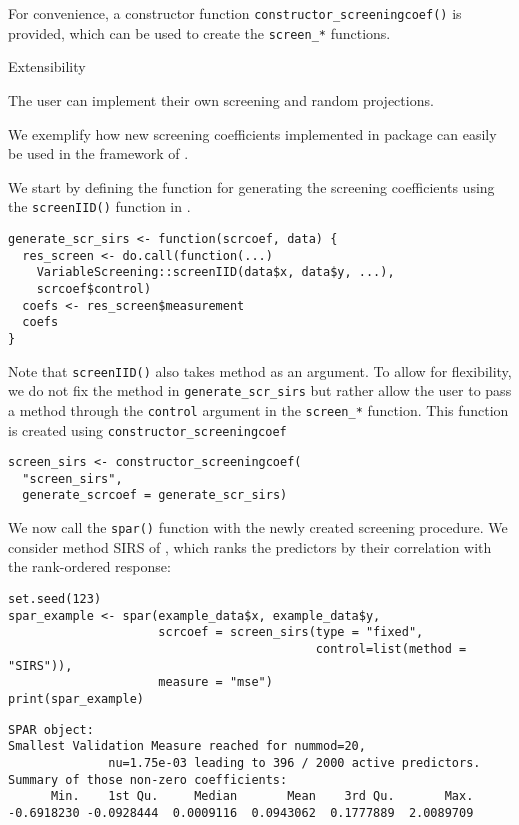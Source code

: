 \documentclass[
  article]{jss}
\begin{document}
For convenience, a constructor function
\texttt{constructor\_screeningcoef()} is provided, which can be used to
create the \texttt{screen\_*} functions.

Extensibility

The user can implement their own screening and random projections.

We exemplify how new screening coefficients implemented in package
 can easily be used in the framework of
.

We start by defining the function for generating the screening
coefficients using the \texttt{screenIID()} function in
.

\begin{verbatim}
generate_scr_sirs <- function(scrcoef, data) {
  res_screen <- do.call(function(...) 
    VariableScreening::screenIID(data$x, data$y, ...), 
    scrcoef$control)
  coefs <- res_screen$measurement
  coefs
}
\end{verbatim}

Note that \texttt{screenIID()} also takes method as an argument. To
allow for flexibility, we do not fix the method in
\texttt{generate\_scr\_sirs} but rather allow the user to pass a method
through the \texttt{control} argument in the \texttt{screen\_*}
function. This function is created using
\texttt{constructor\_screeningcoef}

\begin{verbatim}
screen_sirs <- constructor_screeningcoef(
  "screen_sirs", 
  generate_scrcoef = generate_scr_sirs)
\end{verbatim}

We now call the \texttt{spar()} function with the newly created
screening procedure. We consider method SIRS of \citet{zhu2011model},
which ranks the predictors by their correlation with the rank-ordered
response:

\begin{verbatim}
set.seed(123)      
spar_example <- spar(example_data$x, example_data$y,
                     scrcoef = screen_sirs(type = "fixed",
                                           control=list(method = "SIRS")),
                     measure = "mse")
print(spar_example)
\end{verbatim}

\begin{verbatim}
SPAR object:
Smallest Validation Measure reached for nummod=20,
              nu=1.75e-03 leading to 396 / 2000 active predictors.
Summary of those non-zero coefficients:
      Min.    1st Qu.     Median       Mean    3rd Qu.       Max. 
-0.6918230 -0.0928444  0.0009116  0.0943062  0.1777889  2.0089709 
\end{verbatim}
\end{document}
